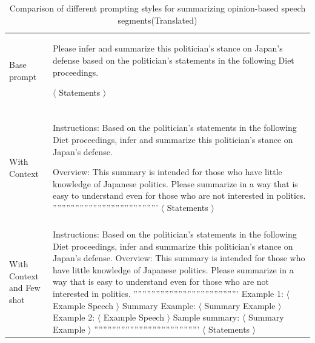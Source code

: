 \documentclass[final,5p,times,twocolumn,authoryear]{elsarticle}
\begin{document}
\begin{table}[htbp] %
\centering

\begin{tabularx}{.45\textwidth}{ p{1.7cm}|X } 
\hline
Base prompt & Please infer and summarize this politician's stance on Japan's defense based on the politician's statements in the following Diet proceedings. 
\newline

$\langle$ Statements $\rangle$ \\\\  
\hline
With Context & Instructions:
\newline
Based on the politician's statements in the following Diet proceedings, infer and summarize this politician's stance on Japan's defense. 
\newline

Overview:
\newline
This summary is intended for those who have little knowledge of Japanese politics. Please summarize in a way that is easy to understand even for those who are not interested in politics.
'''''''''''''''''''''''''''''''''''''''''''''''
\newline
$\langle$ Statements $\rangle$ \\ \\ 
\hline
With Context and Few shot  & Instructions:
\newline
Based on the politician's statements in the following Diet proceedings, infer and summarize this politician's stance on Japan's defense. 
\newline
Overview:
\newline
This summary is intended for those who have little knowledge of Japanese politics. Please summarize in a way that is easy to understand even for those who are not interested in politics.
'''''''''''''''''''''''''''''''''''''''''''''''
\newline
Example 1:
\newline
$\langle$ Example Speech $\rangle$
\newline
Summary Example:
\newline
$\langle$ Summary Example $\rangle$
\newline
Example 2:
\newline
$\langle$ Example Speech $\rangle$
\newline
Sample summary:
\newline
$\langle$ Summary Example $\rangle$
\newline
'''''''''''''''''''''''''''''''''''''''''''''''
\newline
$\langle$ Statements $\rangle$ \\
\hline
\end{tabularx}
\caption{Comparison of different prompting styles for summarizing opinion-based speech segments(Translated)}
\label{tab:summary prompt styles}
\end{table}
\end{document}
